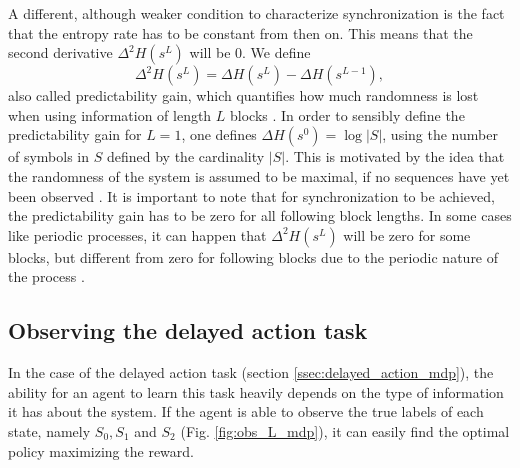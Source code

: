\documentclass[12pt,a4paper]{article}
\begin{document}
A different, although weaker condition to characterize synchronization is the fact that the entropy rate has to be constant from then on. This means that the second derivative $\Delta^2 H(s^L)$ will be 0.
We define
\begin{equation}
    \label{eq:predictability_gain}
    \Delta^2 H(s^L) = \Delta H(s^L) - \Delta H(s^{L-1}),
\end{equation}
also called predictability gain, which quantifies how much randomness is lost when using information of length $L$ blocks \autocite{crutchfield2003regularities}.
In order to sensibly define the predictability gain for $L=1$, one defines $\Delta H(s^0) = \log |S|$, using the number of symbols in $S$ defined by the cardinality $|S|$.
This is motivated by the idea that the randomness of the system is assumed to be maximal, if no sequences have yet been observed \autocite{crutchfield2003regularities}.
It is important to note that for synchronization to be achieved, the predictability gain has to be zero for all following block lengths.
In some cases like periodic processes, it can happen that $\Delta^2 H(s^L)$ will be zero for some blocks, but different from zero for following blocks due to the periodic nature of the process \autocite{crutchfield2003regularities}.

\subsection{Observing the delayed action task} \label{ssec:observing_mdp}
In the case of the delayed action task (section \ref{ssec:delayed_action_mdp}), the ability for an agent to learn this task heavily depends on the type of information it has about the system.
If the agent is able to observe the true labels of each state, namely $S_0, S_1$ and $S_2$ (Fig. \ref{fig:obs_L_mdp}), it can easily find the optimal policy maximizing the reward.
\end{document}
